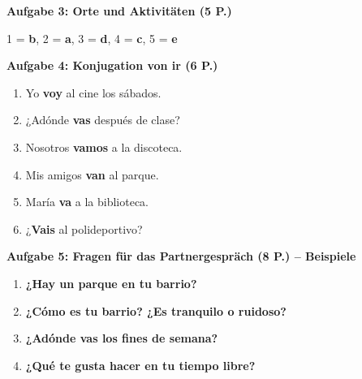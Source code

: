 \documentclass[11pt,a4paper]{article}
\newcommand{\lsg}[1]{\textcolor{loesung}{\textbf{#1}}}
\begin{document}
\begin{gruppenbox}
\textbf{Aufgabe 3: Orte und Aktivitäten (5 P.)}

1 = \lsg{b}, 2 = \lsg{a}, 3 = \lsg{d}, 4 = \lsg{c}, 5 = \lsg{e}

\vspace{0.5em}

\textbf{Aufgabe 4: Konjugation von ir (6 P.)}
\begin{enumerate}[label=\alph*), leftmargin=2em, nosep]
    \item Yo \lsg{voy} al cine los sábados.
    \item ¿Adónde \lsg{vas} después de clase?
    \item Nosotros \lsg{vamos} a la discoteca.
    \item Mis amigos \lsg{van} al parque.
    \item María \lsg{va} a la biblioteca.
    \item ¿\lsg{Vais} al polideportivo?
\end{enumerate}

\vspace{0.5em}

\textbf{Aufgabe 5: Fragen für das Partnergespräch (8 P.) -- Beispiele}
\begin{enumerate}[leftmargin=2em, nosep]
    \item \lsg{¿Hay un parque en tu barrio?}
    \item \lsg{¿Cómo es tu barrio? ¿Es tranquilo o ruidoso?}
    \item \lsg{¿Adónde vas los fines de semana?}
    \item \lsg{¿Qué te gusta hacer en tu tiempo libre?}
\end{enumerate}

\end{gruppenbox}

\vspace{1em}
\end{document}
